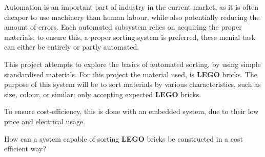 Automation is an important part of industry in the current market, as it is often cheaper to use machinery than human labour, while also potentially reducing the amount of errors.
Each automated subsystem relies on acquiring the proper materials; to ensure this, a proper sorting system is preferred, these menial task can either be entirely or partly automated.

This project attempts to explore the basics of automated sorting, by using simple standardised materials.
For this project the material used, is \textbf{LEGO} bricks.
The purpose of this system will be to sort materials by various characteristics, such as size, colour, or similar; only accepting expected \textbf{LEGO} bricks.

To ensure cost-efficiency, this is done with an embedded system, due to their low price and electrical usage.

How can a system capable of sorting \textbf{LEGO} bricks be constructed in a cost efficient way?

